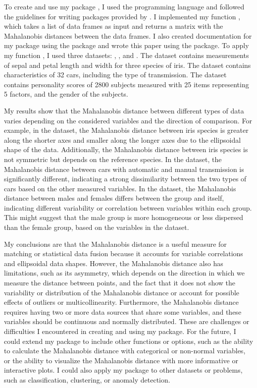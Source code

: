 \documentclass[article]{jss}
\begin{document}
To create and use my package , I used the programming language  and followed the guidelines for writing  packages provided by \cite{wickham2015}. I implemented my function , which takes a list of data frames as input and returns a matrix with the Mahalanobis distances between the data frames. I also created documentation for my package using the  package and wrote this paper using the  package. To apply my function , I used three datasets: , , and . The  dataset contains measurements of sepal and petal length and width for three species of iris. The  dataset contains characteristics of 32 cars, including the type of transmission. The  dataset contains personality scores of 2800 subjects measured with 25 items representing 5 factors, and the gender of the subjects.

My results show that the Mahalanobis distance between different types of data varies depending on the considered variables and the direction of comparison. For example, in the  dataset, the Mahalanobis distance between iris species is greater along the shorter axes and smaller along the longer axes due to the ellipsoidal shape of the data. Additionally, the Mahalanobis distance between iris species is not symmetric but depends on the reference species. In the  dataset, the Mahalanobis distance between cars with automatic and manual transmission is significantly different, indicating a strong dissimilarity between the two types of cars based on the other measured variables. In the  dataset, the Mahalanobis distance between males and females differs between the group and itself, indicating different variability or correlation between variables within each group. This might suggest that the male group is more homogeneous or less dispersed than the female group, based on the variables in the  dataset.

My conclusions are that the Mahalanobis distance is a useful measure for matching or statistical data fusion because it accounts for variable correlations and ellipsoidal data shapes. However, the Mahalanobis distance also has limitations, such as its asymmetry, which depends on the direction in which we measure the distance between points, and the fact that it does not show the variability or distribution of the Mahalanobis distance or account for possible effects of outliers or multicollinearity. Furthermore, the Mahalanobis distance requires having two or more data sources that share some variables, and these variables should be continuous and normally distributed. These are challenges or difficulties I encountered in creating and using my  package. For the future, I could extend my package to include other functions or options, such as the ability to calculate the Mahalanobis distance with categorical or non-normal variables, or the ability to visualize the Mahalanobis distance with more informative or interactive plots. I could also apply my package to other datasets or problems, such as classification, clustering, or anomaly detection.
\end{document}
